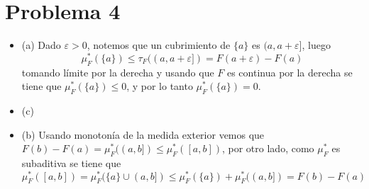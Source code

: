 \documentclass{article}
\begin{document}
\section*{Problema 4}
\begin{itemize}
    \item (a) Dado $\varepsilon>0$, notemos que un cubrimiento de $\{a\}$ es $(a,a+\varepsilon]$,
    luego
    \begin{equation*}
        \mu^{*}_{F}(\{a\})\leq\tau_{F}((a,a+\varepsilon])=F(a+\varepsilon)-F(a)
    \end{equation*}
    tomando límite por la derecha y usando que $F$ es continua por la derecha se tiene que 
    $\mu^{*}_{F}(\{a\})\leq0$, y por lo tanto $\mu^{*}_{F}(\{a\})=0$.

    \item (c)

    \item (b) Usando monotonía de la medida exterior vemos que 
    $F(b)-F(a)=\mu^{*}_{F}((a,b])\leq\mu^{*}_{F}([a,b])$, por otro lado, como $\mu^{*}_{F}$ es
    subaditiva se tiene que
    \begin{equation*}
        \mu^{*}_{F}([a,b])=\mu^{*}_{F}(\{a\}\cup(a,b])\leq\mu^{*}_{F}(\{a\})+\mu^{*}_{F}((a,b])
        =F(b)-F(a)
    \end{equation*}
\end{itemize}

\end{document}
